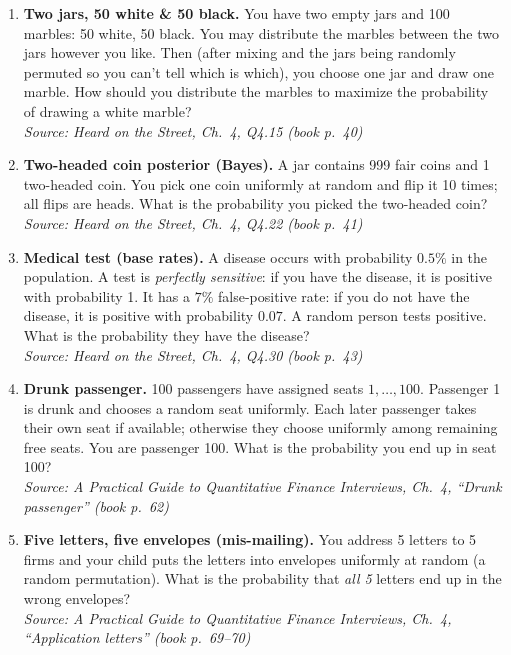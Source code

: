 \documentclass[11pt]{article}
\begin{document}
\begin{enumerate}[label=\textbf{\arabic*.}, resume]

\item \textbf{Two jars, 50 white \& 50 black.}
You have two empty jars and 100 marbles: 50 white, 50 black.
You may distribute the marbles between the two jars however you like.
Then (after mixing and the jars being randomly permuted so you can’t tell which is which), you choose one jar and draw one marble.
How should you distribute the marbles to maximize the probability of drawing a white marble?\\
\hfill{\small\textit{Source: Heard on the Street, Ch.\ 4, Q4.15 (book p.\ 40)}}

\item \textbf{Two-headed coin posterior (Bayes).}
A jar contains 999 fair coins and 1 two-headed coin.
You pick one coin uniformly at random and flip it 10 times; all flips are heads.
What is the probability you picked the two-headed coin?\\
\hfill{\small\textit{Source: Heard on the Street, Ch.\ 4, Q4.22 (book p.\ 41)}}

\item \textbf{Medical test (base rates).}
A disease occurs with probability $0.5\%$ in the population.
A test is \emph{perfectly sensitive}: if you have the disease, it is positive with probability 1.
It has a $7\%$ false-positive rate: if you do not have the disease, it is positive with probability $0.07$.
A random person tests positive. What is the probability they have the disease?\\
\hfill{\small\textit{Source: Heard on the Street, Ch.\ 4, Q4.30 (book p.\ 43)}}

\item \textbf{Drunk passenger.}
100 passengers have assigned seats $1,\dots,100$.
Passenger 1 is drunk and chooses a random seat uniformly.
Each later passenger takes their own seat if available; otherwise they choose uniformly among remaining free seats.
You are passenger 100. What is the probability you end up in seat 100?\\
\hfill{\small\textit{Source: A Practical Guide to Quantitative Finance Interviews, Ch.\ 4, ``Drunk passenger'' (book p.\ 62)}}

\item \textbf{Five letters, five envelopes (mis-mailing).}
You address 5 letters to 5 firms and your child puts the letters into envelopes uniformly at random (a random permutation).
What is the probability that \emph{all 5} letters end up in the wrong envelopes?\\
\hfill{\small\textit{Source: A Practical Guide to Quantitative Finance Interviews, Ch.\ 4, ``Application letters'' (book p.\ 69--70)}}


\end{enumerate}
\end{document}
